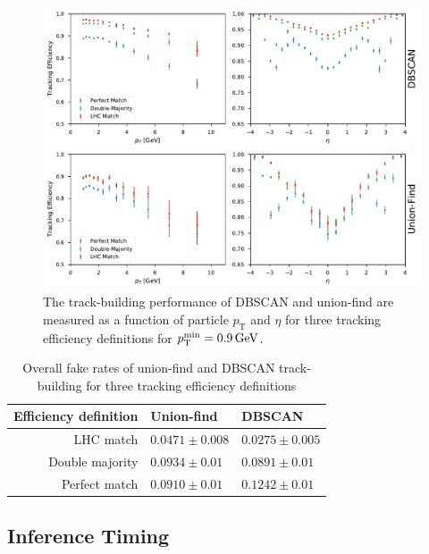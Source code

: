 \documentclass[twocolumn]{svjour3}
\newcommand{\pt}{\ensuremath{p_{\mathrm{T}}}\xspace}
\newcommand{\GeV}{\ensuremath{\,\text{Ge\hspace{-.08em}V}}\xspace}
\begin{document}
\begin{figure}[!htbp]
\centering
\includegraphics[width=2\columnwidth,clip]{tracking_efficiencies.pdf}
\caption{The track-building performance of DBSCAN and union-find are measured as a function of particle $\pt$ and $\eta$ for three tracking efficiency definitions for $\pt^\mathrm{min}=0.9\GeV$. }
\label{fig:tracking-effs}
\end{figure}

\begin{table}[!htbp]
    \centering
    \begin{tabular}{r|ll}
        Efficiency definition & Union-find & DBSCAN\\
        \hline
        LHC match & $0.0471\pm0.008$ & $0.0275\pm0.005$\\
        Double majority & $0.0934\pm0.01$ & $0.0891\pm0.01$\\
        Perfect match & $0.0910\pm0.01$ & $0.1242\pm0.01$\\
    \end{tabular}
    \caption{Overall fake rates of union-find and DBSCAN track-building for three tracking efficiency definitions}
    \label{tab:fake-rate}
\end{table}

\subsection{Inference Timing}
\label{sec:timing}
\end{document}
